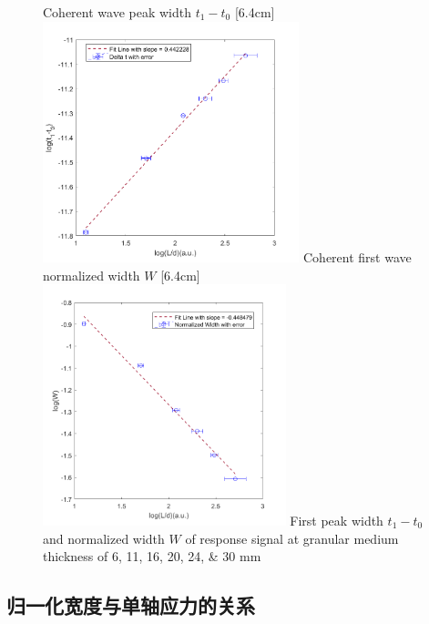 \begin{figure}[!hbtp]
  \centering
                  {Coherent wave peak width $t_{1} - t_{0}$}%
                  [6.4cm]{\includegraphics[height=7cm]{figures/2_t1-t0_L.png}}
  \hspace{1cm}
                  {Coherent first wave normalized width $W$}%
                  [6.4cm]{\includegraphics[height=7cm]{figures/2_W_L.png}}
                  {First peak width $t_{1} - t_{0}$ and normalized width $W$ of response signal at granular medium thickness of \numlist[
                    list-final-separator = { and }
                  ]{6;11;16;20;24;30} \unit{\milli\metre}}
  \label{fig:normalized_width_versus_L}
\end{figure}

\subsection{归一化宽度与单轴应力的关系}

